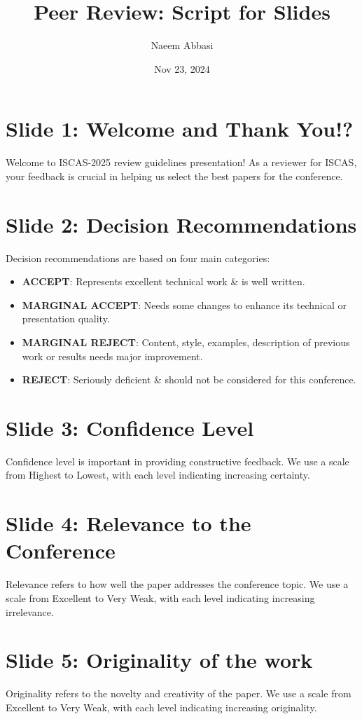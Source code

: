 \documentclass{article}
\title{Peer Review: Script for Slides}
\author{Naeem Abbasi}
\date{Nov 23, 2024}
\begin{document}
\maketitle

\section*{Slide 1: Welcome and Thank You!?}
Welcome to ISCAS-2025 review guidelines presentation! As a reviewer for ISCAS, your feedback is crucial in helping us select the best papers for the conference.

\section*{Slide 2: Decision Recommendations}
Decision recommendations are based on four main categories:
\begin{itemize}
  \item \textbf{ACCEPT}: Represents excellent technical work \& is well written.
  \item \textbf{MARGINAL ACCEPT}: Needs some changes to enhance its technical or presentation quality.
  \item \textbf{MARGINAL REJECT}: Content, style, examples, description of previous work or results needs major improvement.
\item \textbf{REJECT}: Seriously deficient \& should not be considered for this conference.
\end{itemize}

\section*{Slide 3: Confidence Level}
Confidence level is important in providing constructive feedback. We use a scale from Highest to Lowest, with each level indicating increasing certainty.

\section*{Slide 4: Relevance to the Conference}
Relevance refers to how well the paper addresses the conference topic. We use a scale from Excellent to Very Weak, with each level indicating increasing irrelevance.

\section*{Slide 5: Originality of the work}
Originality refers to the novelty and creativity of the paper. We use a scale from Excellent to Very Weak, with each level indicating increasing originality.
\end{document}
